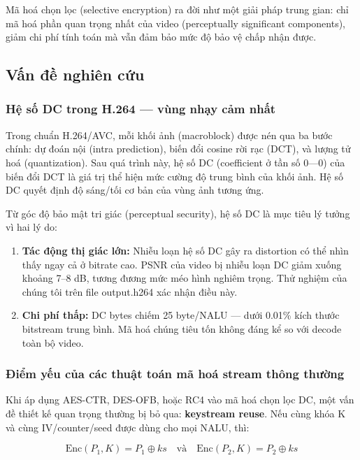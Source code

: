 Mã hoá chọn lọc (selective encryption) \cite{cheng_selective} ra đời như một giải pháp
trung gian: chỉ mã hoá phần quan trọng nhất của video (perceptually significant
components), giảm chi phí tính toán mà vẫn đảm bảo mức độ bảo vệ chấp nhận được.

\subsection{Vấn đề nghiên cứu}

\subsubsection{Hệ số DC trong H.264 --- vùng nhạy cảm nhất}

Trong chuẩn H.264/AVC, mỗi khối ảnh (macroblock) được nén qua ba bước chính:
dự đoán nội (intra prediction), biến đổi cosine rời rạc (DCT), và lượng tử hoá
(quantization). Sau quá trình này, hệ số DC (coefficient ở tần số 0---0) của
biến đổi DCT là giá trị thể hiện mức cường độ trung bình của khối ảnh.
Hệ số DC quyết định độ sáng/tối cơ bản của vùng ảnh tương ứng.

Từ góc độ bảo mật tri giác (perceptual security), hệ số DC là mục tiêu lý tưởng
vì hai lý do:
\begin{enumerate}
  \item \textbf{Tác động thị giác lớn:} Nhiễu loạn hệ số DC gây ra distortion
        có thể nhìn thấy ngay cả ở bitrate cao. PSNR của video bị nhiễu loạn DC
        giảm xuống khoảng 7--8 dB, tương đương mức méo hình nghiêm trọng.
        Thử nghiệm của chúng tôi trên file output.h264 xác nhận điều này.

  \item \textbf{Chi phí thấp:} DC bytes chiếm 25 byte/NALU --- dưới 0.01\%
        kích thước bitstream trung bình. Mã hoá chúng tiêu tốn không đáng kể
        so với decode toàn bộ video.
\end{enumerate}

\subsubsection{Điểm yếu của các thuật toán mã hoá stream thông thường}

Khi áp dụng AES-CTR, DES-OFB, hoặc RC4 vào mã hoá chọn lọc DC, một vấn đề thiết
kế quan trọng thường bị bỏ qua: \textbf{keystream reuse}. Nếu cùng khóa K và cùng
IV/counter/seed được dùng cho mọi NALU, thì:

\begin{equation}
\text{Enc}(P_1, K) = P_1 \oplus ks \quad\text{và}\quad \text{Enc}(P_2, K) = P_2 \oplus ks
\end{equation}

